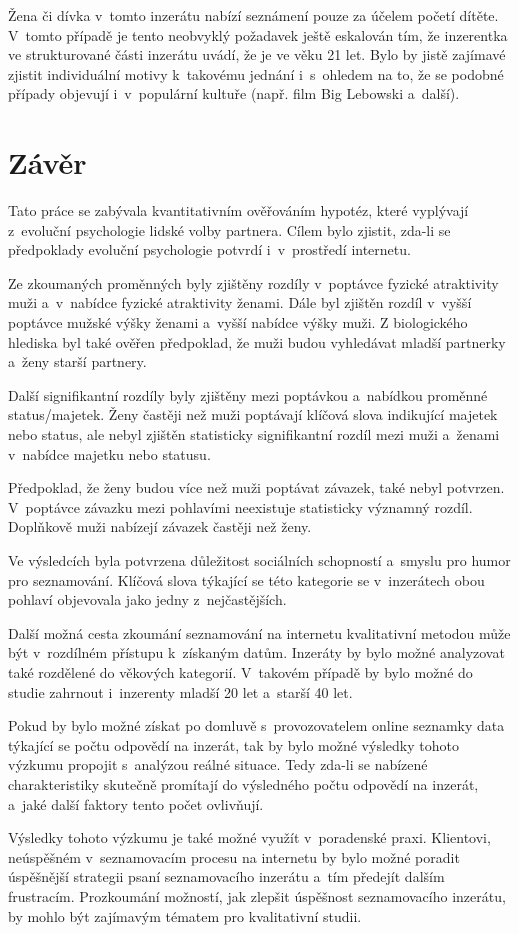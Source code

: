 \documentclass[a4paper, 12pt, notitlepage, oneside, numbers=noenddot]{report}
\begin{document}
Žena či dívka v~tomto inzerátu nabízí seznámení pouze za účelem početí
dítěte.  V~tomto případě je tento neobvyklý požadavek ještě eskalován
tím, že inzerentka ve strukturované části inzerátu uvádí, že je ve
věku 21 let. Bylo by jistě zajímavé zjistit individuální motivy
k~takovému jednání i~s~ohledem na to, že se podobné případy objevují
i~v~populární kultuře (např. film Big Lebowski a~další).

\chapter{Závěr}

Tato práce se zabývala kvantitativním ověřováním hypotéz, které
vyplývají z~evoluční psychologie lidské volby partnera.  Cílem bylo
zjistit, zda-li se předpoklady evoluční psychologie potvrdí
i~v~prostředí internetu.

Ze zkoumaných proměnných byly zjištěny rozdíly v~poptávce fyzické
atraktivity muži a~v~nabídce fyzické atraktivity ženami.  Dále byl
zjištěn rozdíl v~vyšší poptávce mužské výšky ženami a~vyšší nabídce
výšky muži.  Z biologického hlediska byl také ověřen před\-po\-klad, že
muži budou vyhledávat mladší partnerky a~ženy starší partnery.

Další signifikantní rozdíly byly zjištěny mezi poptávkou a~nabídkou
proměnné status/majetek.  Ženy častěji než muži poptávají klíčová
slova indikující majetek nebo status, ale nebyl zjištěn statisticky
signifikantní rozdíl mezi muži a~ženami v~nabídce majetku nebo statusu.

Předpoklad, že ženy budou více než muži poptávat závazek, také nebyl
potvrzen.  V~poptávce závazku mezi pohlavími neexistuje statisticky
významný rozdíl.  Doplňkově muži nabízejí závazek častěji než ženy.

Ve výsledcích byla potvrzena důležitost sociálních schopností a~smyslu
pro humor pro seznamování.  Klíčová slova týkající se této kategorie
se v~inzerátech obou pohlaví objevovala jako jedny z~nejčastějších.

Další možná cesta zkoumání seznamování na internetu kvalitativní
metodou může být v~rozdílném přístupu k~získaným datům.  Inzeráty by
bylo možné analyzovat také rozdělené do věkových kategorií.  V~takovém
případě by bylo možné do studie zahrnout i~inzerenty mladší 20 let
a~starší 40 let.

Pokud by bylo možné získat po domluvě s~provozovatelem online seznamky
data týkající se počtu odpovědí na inzerát, tak by bylo možné výsledky
tohoto výzkumu propojit s~analýzou reálné situace.  Tedy zda-li se
nabízené charakteristiky skutečně promítají do výsledného počtu
odpovědí na inzerát, a~jaké další faktory tento počet ovlivňují.

Výsledky tohoto výzkumu je také možné využít v~poradenské praxi.
Klientovi, ne\-ús\-pě\-š\-ném v~seznamovacím procesu na internetu by bylo
možné poradit úspěšnější strategii psaní seznamovacího inzerátu a~tím
předejít dalším frustracím.  Prozkoumání možností, jak zlepšit
úspěšnost seznamovacího inzerátu, by mohlo být zajímavým tématem pro
kvalitativní studii.

\clearpage
\singlespacing

%

\end{document}
